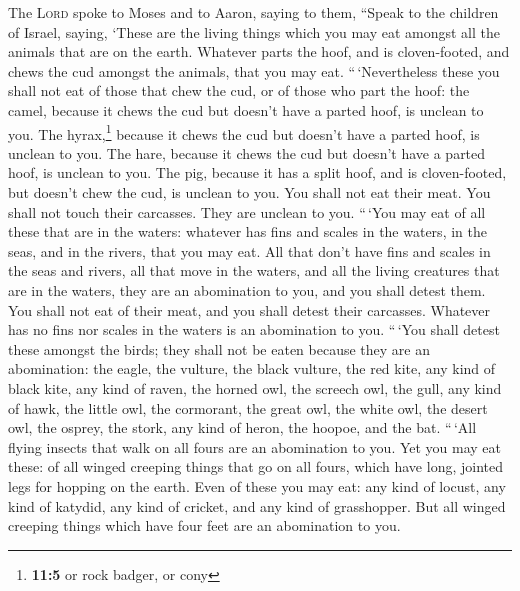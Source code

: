  The \textsc{Lord} spoke to Moses and to Aaron, saying to
them,  ``Speak to the children of Israel, saying, `These
are the living things which you may eat amongst all the animals that are
on the earth.  Whatever parts the hoof, and is
cloven-footed, and chews the cud amongst the animals, that you may eat.
 ``\,`Nevertheless these you shall not eat of those that
chew the cud, or of those who part the hoof: the camel, because it chews
the cud but doesn't have a parted hoof, is unclean to you.
 The hyrax,\footnote{\textbf{11:5} or rock badger, or cony}
because it chews the cud but doesn't have a parted hoof, is unclean to
you.  The hare, because it chews the cud but doesn't have
a parted hoof, is unclean to you.  The pig, because it has
a split hoof, and is cloven-footed, but doesn't chew the cud, is unclean
to you.  You shall not eat their meat. You shall not touch
their carcasses. They are unclean to you.  ``\,`You may
eat of all these that are in the waters: whatever has fins and scales in
the waters, in the seas, and in the rivers, that you may eat.
 All that don't have fins and scales in the seas and
rivers, all that move in the waters, and all the living creatures that
are in the waters, they are an abomination to you,  and
you shall detest them. You shall not eat of their meat, and you shall
detest their carcasses.  Whatever has no fins nor scales
in the waters is an abomination to you.  ``\,`You shall
detest these amongst the birds; they shall not be eaten because they are
an abomination: the eagle, the vulture, the black vulture,
 the red kite, any kind of black kite, 
any kind of raven,  the horned owl, the screech owl, the
gull, any kind of hawk,  the little owl, the cormorant,
the great owl,  the white owl, the desert owl, the
osprey,  the stork, any kind of heron, the hoopoe, and
the bat.  ``\,`All flying insects that walk on all fours
are an abomination to you.  Yet you may eat these: of all
winged creeping things that go on all fours, which have long, jointed
legs for hopping on the earth.  Even of these you may
eat: any kind of locust, any kind of katydid, any kind of cricket, and
any kind of grasshopper.  But all winged creeping things
which have four feet are an abomination to you.

